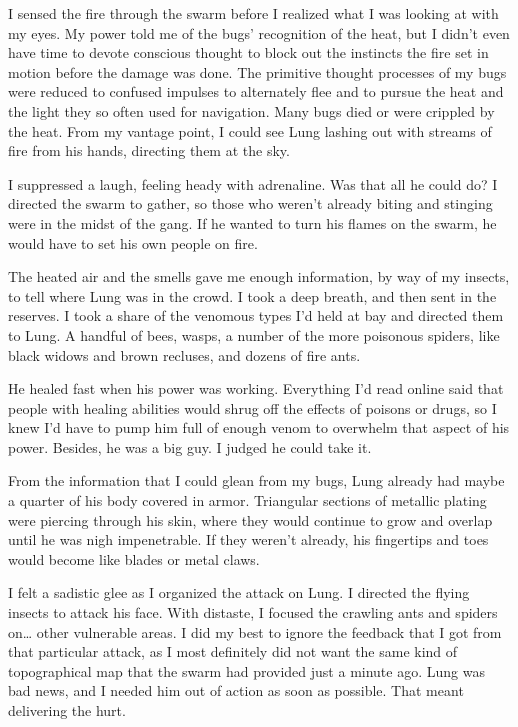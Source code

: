 I sensed the fire through the swarm before I realized what I was looking at with my eyes. My power told me of the bugs' recognition of the heat, but I didn't even have time to devote conscious thought to block out the instincts the fire set in motion before the damage was done. The primitive thought processes of my bugs were reduced to confused impulses to alternately flee and to pursue the heat and the light they so often used for navigation. Many bugs died or were crippled by the heat. From my vantage point, I could see Lung lashing out with streams of fire from his hands, directing them at the sky.

I suppressed a laugh, feeling heady with adrenaline. Was that all he could do? I directed the swarm to gather, so those who weren't already biting and stinging were in the midst of the gang. If he wanted to turn his flames on the swarm, he would have to set his own people on fire.

The heated air and the smells gave me enough information, by way of my insects, to tell where Lung was in the crowd. I took a deep breath, and then sent in the reserves. I took a share of the venomous types I'd held at bay and directed them to Lung. A handful of bees, wasps, a number of the more poisonous spiders, like black widows and brown recluses, and dozens of fire ants.

He healed fast when his power was working. Everything I'd read online said that people with healing abilities would shrug off the effects of poisons or drugs, so I knew I'd have to pump him full of enough venom to overwhelm that aspect of his power. Besides, he was a big guy. I judged he could take it.

From the information that I could glean from my bugs, Lung already had maybe a quarter of his body covered in armor. Triangular sections of metallic plating were piercing through his skin, where they would continue to grow and overlap until he was nigh impenetrable. If they weren't already, his fingertips and toes would become like blades or metal claws.

I felt a sadistic glee as I organized the attack on Lung. I directed the flying insects to attack his face. With distaste, I focused the crawling ants and spiders on\ldots{} other vulnerable areas. I did my best to ignore the feedback that I got from that particular attack, as I most definitely did not want the same kind of topographical map that the swarm had provided just a minute ago. Lung was bad news, and I needed him out of action as soon as possible. That meant delivering the hurt.


